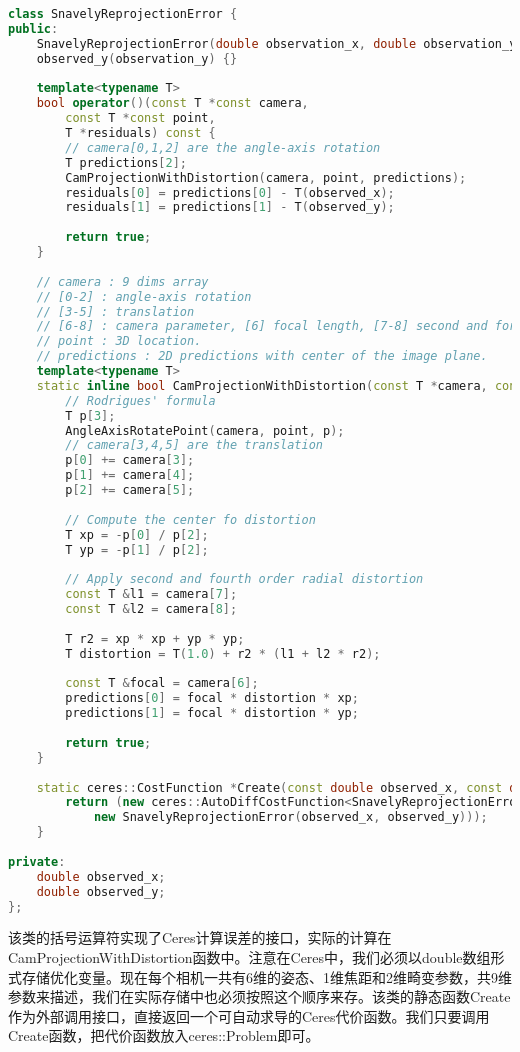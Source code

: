 \begin{lstlisting}[language=c++, caption=slambook2/ch9/SnavelyReprojectionError.cpp（片段）]
class SnavelyReprojectionError {
public:
	SnavelyReprojectionError(double observation_x, double observation_y) : observed_x(observation_x),
	observed_y(observation_y) {}
	
	template<typename T>
	bool operator()(const T *const camera,
		const T *const point,
		T *residuals) const {
		// camera[0,1,2] are the angle-axis rotation
		T predictions[2];
		CamProjectionWithDistortion(camera, point, predictions);
		residuals[0] = predictions[0] - T(observed_x);
		residuals[1] = predictions[1] - T(observed_y);
		
		return true;
	}
	
	// camera : 9 dims array
	// [0-2] : angle-axis rotation
	// [3-5] : translation
	// [6-8] : camera parameter, [6] focal length, [7-8] second and forth order radial distortion
	// point : 3D location.
	// predictions : 2D predictions with center of the image plane.
	template<typename T>
	static inline bool CamProjectionWithDistortion(const T *camera, const T *point, T *predictions) {
		// Rodrigues' formula
		T p[3];
		AngleAxisRotatePoint(camera, point, p);
		// camera[3,4,5] are the translation
		p[0] += camera[3];
		p[1] += camera[4];
		p[2] += camera[5];
		
		// Compute the center fo distortion
		T xp = -p[0] / p[2];
		T yp = -p[1] / p[2];
		
		// Apply second and fourth order radial distortion
		const T &l1 = camera[7];
		const T &l2 = camera[8];
		
		T r2 = xp * xp + yp * yp;
		T distortion = T(1.0) + r2 * (l1 + l2 * r2);
		
		const T &focal = camera[6];
		predictions[0] = focal * distortion * xp;
		predictions[1] = focal * distortion * yp;
		
		return true;
	}
	
	static ceres::CostFunction *Create(const double observed_x, const double observed_y) {
		return (new ceres::AutoDiffCostFunction<SnavelyReprojectionError, 2, 9, 3>(
			new SnavelyReprojectionError(observed_x, observed_y)));
	}
	
private:
	double observed_x;
	double observed_y;
};
\end{lstlisting}
该类的括号运算符实现了Ceres计算误差的接口，实际的计算在CamProjectionWithDistortion函数中。注意在Ceres中，我们必须以double数组形式存储优化变量。现在每个相机一共有6维的姿态、1维焦距和2维畸变参数，共9维参数来描述，我们在实际存储中也必须按照这个顺序来存。该类的静态函数Create作为外部调用接口，直接返回一个可自动求导的Ceres代价函数。我们只要调用Create函数，把代价函数放入ceres::Problem即可。

